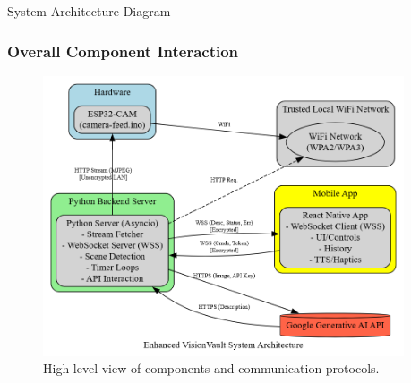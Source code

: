 \documentclass{beamer}
\begin{document}
\begin{frame}{System Architecture Diagram}
    \frametitle{Overall Component Interaction}
    \begin{figure}
        \centering
        \includegraphics[width=0.95\textwidth]{Sys_Arch.png} %
        \caption{High-level view of components and communication protocols.}
    \end{figure}
\end{frame}
\end{document}
